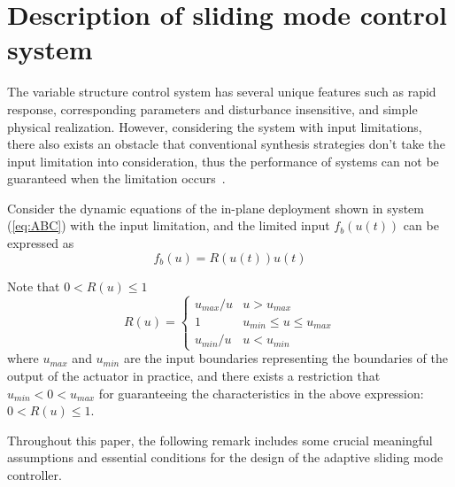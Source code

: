 \documentclass[3p]{elsarticle}
\theoremstyle{plain}
\begin{document}
\section{Description of sliding mode control system}\label{sec:SMC}
The variable structure control system has several unique features such as rapid response, corresponding parameters and disturbance insensitive, and simple physical realization. However, considering the system with input limitations, there also exists an obstacle that conventional synthesis strategies don't take the input limitation into consideration, thus the performance of systems can not be guaranteed when the limitation occurs~\cite{Hu2008Robust}.\par
Consider the dynamic equations of the in-plane deployment shown in system (\ref{eq:ABC}) with the input limitation, and the limited input $f_{b}(u(t))$ can be expressed as
\begin{equation}
f_b(u)=R(u(t))u(t)\label{eq:satu}
\end{equation}\par
Note that $0 < R(u) \le 1$
\begin{equation}
R(u) =\begin{cases}
u_{max}/u   & u > u_{max}\\
1           & u_{min} \le u \le u_{max}\\
u_{min}/u   & u < u_{min}
\end{cases}\label{eq:ru}
\end{equation}
where $u_{max}$ and $u_{min}$ are the input boundaries representing the boundaries of the output of the actuator in practice, and there exists a restriction that $u_{min}<0<u_{max}$ for guaranteeing the characteristics in the above expression: $0<R(u)\le 1$. \par
Throughout this paper, the following remark includes some crucial meaningful assumptions and essential conditions for the design of the adaptive sliding mode controller.
\end{document}
